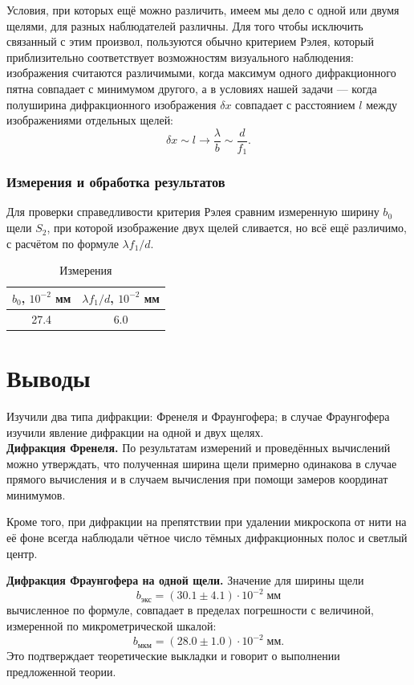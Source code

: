 \documentclass[a4paper, 12pt]{article}%
\begin{document}
 	Условия, при которых ещё можно различить, имеем мы дело с одной или двумя щелями, для разных наблюдателей различны. Для того чтобы исключить связанный с этим произвол, пользуются обычно критерием Рэлея, который приблизительно соответствует возможностям визуального наблюдения: изображения считаются различимыми, когда максимум одного дифракционного пятна совпадает с минимумом другого, а в условиях нашей задачи --- когда полуширина дифракционного изображения $\delta x$ совпадает с расстоянием $l$ между изображениями отдельных щелей:
 	\begin{equation}
 		\delta x \sim l \to \dfrac{\lambda}{b} \sim \dfrac{d}{f_1}.
 	\end{equation}
 	
 	\subsubsection{Измерения и обработка результатов}
 	
 	Для проверки справедливости критерия Рэлея сравним измеренную ширину $b_0$ щели $S_2$, при которой изображение двух щелей сливается, но всё ещё различимо, с расчётом по формуле $\lambda f_1/d$.
 	
 	\begin{table}[h!]
 		\centering
 		\caption{Измерения}
 		\begin{tabular}{|c|c|} \hline
 			$b_0$, $10^{-2}$ мм &	$\lambda f_1/d$, $10^{-2}$ мм \\
 			\hline
 			27.4 &	6.0 \\ \hline
 		\end{tabular}   
 	\end{table}
 	\section{Выводы}
 	Изучили два типа дифракции: Френеля и Фраунгофера; в случае Фраунгофера изучили явление дифракции на одной и двух щелях.\\
 	
 	\textbf{Дифракция Френеля.} По результатам измерений и проведённых вычислений можно утверждать, что полученная ширина щели примерно одинакова в случае прямого вычисления и в случаем вычисления при помощи замеров координат минимумов.
 	
 	Кроме того, при дифракции на препятствии при удалении микроскопа от нити на её фоне всегда наблюдали чётное число тёмных дифракционных полос и светлый центр.
 	
 	\textbf{Дифракция Фраунгофера на одной щели.} Значение для ширины щели
 	\begin{equation*}
 		b_\text{экс} =  (30.1 \pm 4.1) \cdot 10^{-2} \; \text{мм} 
 	\end{equation*}
 	вычисленное по формуле, совпадает в пределах погрешности с величиной, измеренной по микрометрической шкалой:
 	\begin{equation*}
 		b_\text{мкм} =  (28.0 \pm 1.0) \cdot 10^{-2} \; \text{мм}.
 	\end{equation*}
 	Это подтверждает теоретические выкладки и говорит о выполнении предложенной теории.\\
 	
\end{document}
